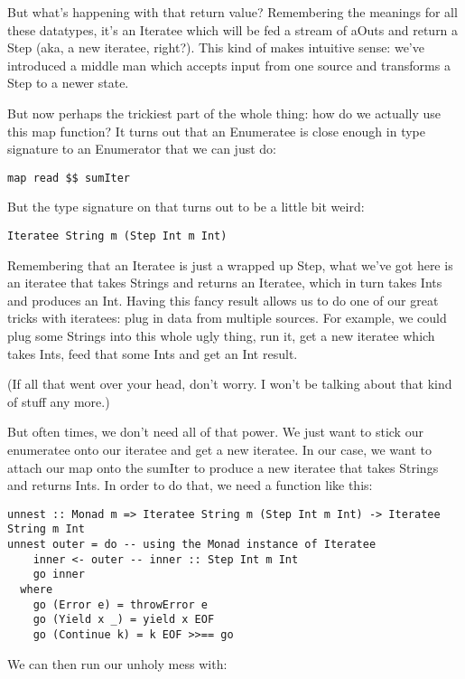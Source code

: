 But what's happening with that return value? Remembering the meanings for all these datatypes, it's an Iteratee which will be fed a stream of aOuts and return a Step (aka, a new iteratee, right?). This kind of makes intuitive sense: we've introduced a middle man which accepts input from one source and transforms a Step to a newer state.

But now perhaps the trickiest part of the whole thing: how do we actually use this map function? It turns out that an Enumeratee is close enough in type signature to an Enumerator that we can just do:

\begin{lstlisting}
map read $$ sumIter
\end{lstlisting}

But the type signature on that turns out to be a little bit weird:

\begin{lstlisting}
Iteratee String m (Step Int m Int)
\end{lstlisting}

Remembering that an Iteratee is just a wrapped up Step, what we've got here is an iteratee that takes Strings and returns an Iteratee, which in turn takes Ints and produces an Int. Having this fancy result allows us to do one of our great tricks with iteratees: plug in data from multiple sources. For example, we could plug some Strings into this whole ugly thing, run it, get a new iteratee which takes Ints, feed that some Ints and get an Int result.

(If all that went over your head, don't worry. I won't be talking about that kind of stuff any more.)

But often times, we don't need all of that power. We just want to stick our enumeratee onto our iteratee and get a new iteratee. In our case, we want to attach our map onto the sumIter to produce a new iteratee that takes Strings and returns Ints. In order to do that, we need a function like this:

\begin{lstlisting}
unnest :: Monad m => Iteratee String m (Step Int m Int) -> Iteratee String m Int
unnest outer = do -- using the Monad instance of Iteratee
    inner <- outer -- inner :: Step Int m Int
    go inner
  where
    go (Error e) = throwError e
    go (Yield x _) = yield x EOF
    go (Continue k) = k EOF >>== go
\end{lstlisting}

We can then run our unholy mess with:

